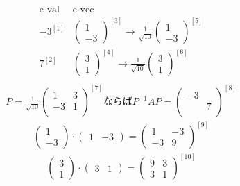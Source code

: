 \[
\begin{array}{c|c}
  \text{e-val} & \text{e-vec} \\ 
  \hline
  -3^{[1]} & 
  \begin{pmatrix}
    1\\
    -3
\end{pmatrix}^{[3]} 
\rightarrow \displaystyle
\frac{1}{\sqrt{10}}
\begin{pmatrix}
  1\\
  -3
\end{pmatrix}^{[5]} \\
\hline
 7^{[2]} & 
 \begin{pmatrix}
  3\\
  1
 \end{pmatrix}^{[4]}
 \rightarrow \displaystyle
\frac{1}{\sqrt{10}}
\begin{pmatrix}
  3\\
  1
\end{pmatrix}^{[6]} \\
\end{array}
\]
\begin{align*} 
  P = 
  \frac{1}{\sqrt{10}}
  \begin{pmatrix}
    1 & 3  \\
    -3 & 1 \\
  \end{pmatrix}^{[7]}
  \text{ならば}
  P^{-1}AP = 
  \begin{pmatrix}
    -3 &  \\
     & 7 \\
  \end{pmatrix}^{[8]}
\end{align*}
\begin{align*}
  \begin{pmatrix}
    1\\
    -3
  \end{pmatrix}
  \cdot
  \begin{pmatrix}
    1 & -3
  \end{pmatrix}
  = 
  \begin{pmatrix}
    1 & -3 \\
    -3 & 9
  \end{pmatrix}^{[9]}
\end{align*}
\begin{align*}
  \begin{pmatrix}
    3\\
    1
  \end{pmatrix}
  \cdot
  \begin{pmatrix}
    3 & 1
  \end{pmatrix}
  = 
  \begin{pmatrix}
    9 & 3 \\
    3 & 1
  \end{pmatrix}^{[10]}
\end{align*}
